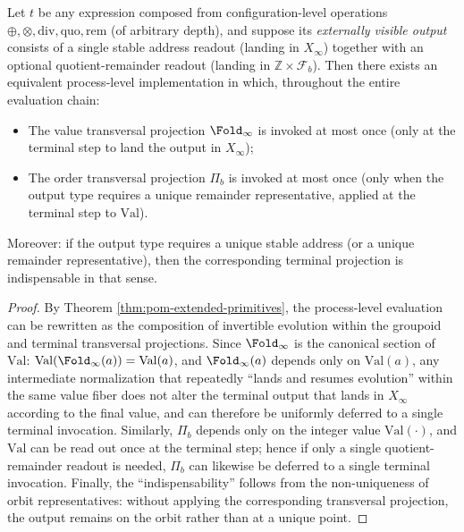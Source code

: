\begin{corollary}\label{cor:pom-projection-budget}
Let \(t\) be any expression composed from configuration-level operations \(\oplus,\otimes,\mathrm{div},\mathrm{quo},\mathrm{rem}\) (of arbitrary depth), and suppose its \emph{externally visible output} consists of a single stable address readout (landing in \(X_\infty\)) together with an optional quotient-remainder readout (landing in \(\mathbb Z\times\mathcal F_b\)).
Then there exists an equivalent process-level implementation in which, throughout the entire evaluation chain:
\begin{itemize}
  \item The value transversal projection \(\Fold_\infty\) is invoked at most once (only at the terminal step to land the output in \(X_\infty\));
  \item The order transversal projection \(\Pi_b\) is invoked at most once (only when the output type requires a unique remainder representative, applied at the terminal step to \(\mathrm{Val}\)).
\end{itemize}
Moreover: if the output type requires a unique stable address (or a unique remainder representative), then the corresponding terminal projection is indispensable in that sense.
\end{corollary}
\begin{proof}
By Theorem \ref{thm:pom-extended-primitives}, the process-level evaluation can be rewritten as the composition of invertible evolution within the groupoid and terminal transversal projections.
Since \(\Fold_\infty\) is the canonical section of \(\mathrm{Val}\): \(\mathrm{Val}(\Fold_\infty(a))=\mathrm{Val}(a)\), and \(\Fold_\infty(a)\) depends only on \(\mathrm{Val}(a)\),
any intermediate normalization that repeatedly ``lands and resumes evolution'' within the same value fiber does not alter the terminal output that lands in \(X_\infty\) according to the final value, and can therefore be uniformly deferred to a single terminal invocation.
Similarly, \(\Pi_b\) depends only on the integer value \(\mathrm{Val}(\cdot)\), and \(\mathrm{Val}\) can be read out once at the terminal step; hence if only a single quotient-remainder readout is needed, \(\Pi_b\) can likewise be deferred to a single terminal invocation.
Finally, the ``indispensability'' follows from the non-uniqueness of orbit representatives: without applying the corresponding transversal projection, the output remains on the orbit rather than at a unique point.
\end{proof}


